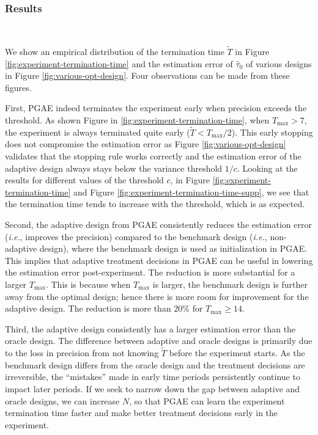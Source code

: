 \subsubsection{ Results}\label{subsec:sequential-result}
\texttt{}\\
{\blue 
We show an empirical distribution of the termination time $\tilde{T}$ in Figure \ref{fig:experiment-termination-time} and the estimation error of $\hat{\tau}_0$ of various designs in Figure \ref{fig:various-opt-design}. Four observations can be made from these figures.

First, PGAE indeed terminates the experiment early when precision exceeds the threshold. As shown Figure in \ref{fig:experiment-termination-time}, when $T_{\max} > 7$, the experiment is always terminated quite early ($\tilde{T}<T_{\max}/2$). This early stopping does not compromise the estimation error as Figure \ref{fig:various-opt-design} validates that the stopping rule works correctly and the estimation error of the adaptive design always stays below the variance threshold $1/c$. Looking at the results for different values of the threshold $c$, in Figure \ref{fig:experiment-termination-time} and Figure \ref{fig:experiment-termination-time-supp}, we see that the termination time tends to increase with the threshold, which is as expected.

Second, the adaptive design from PGAE consistently reduces the estimation error ({\it i.e.}, improves the precision) compared to the benchmark design ({\it i.e.}, non-adaptive design), where the benchmark design is used as initialization in PGAE. This implies that adaptive treatment decisions in PGAE can be useful in lowering the estimation error post-experiment. The reduction is more substantial for a larger $T_{\max}$. This is because when $T_{\max}$ is larger, the benchmark design is further away from the optimal design; hence there is more room for improvement for the adaptive design. The reduction is more than 20\% for $T_{\max} \geq 14$.


Third, the adaptive design consistently has a larger estimation error than the oracle design. The difference between adaptive and oracle designs is primarily due to the loss in precision from not knowing $\tilde{T}$ before the experiment starts. As the benchmark design differs from the oracle design and the treatment decisions are irreversible, the ``mistakes'' made in early time periods persistently continue to impact later periods. If we seek to narrow down the gap between adaptive and oracle designs, we can increase $N$, so that PGAE can learn the experiment termination time faster and make better treatment decisions early in the experiment.




}

